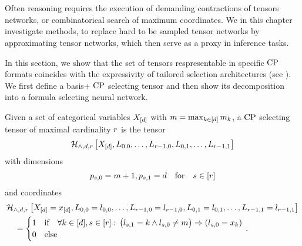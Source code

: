 \chapter{\chatextapproximation}\label{cha:approximation}

Often reasoning requires the execution of demanding contractions of tensors networks, or combinatorical search of maximum coordinates.
We in this chapter investigate methods, to replace hard to be sampled tensor networks by approximating tensor networks, which then serve as a proxy in inference tasks.



In this section, we show that the set of tensors respresentable in specific $\mathrm{CP}$ formats coincides with the expressivity of tailored selection architectures (see ).
We first define a basis+ $\mathrm{CP}$ selecting tensor and then show its decomposition into a formula selecting neural network.

\begin{definition}
    \label{def:cpSelection}
    Given a set of categorical variables $X_{[d]}$ with $m=\max_{k\in[d]}m_{k}$, a $\mathrm{CP}$ selecting tensor of maximal cardinality $r$ is the tensor
    \begin{align*}
        \mathcal{H}_{\land,d,r}\left[X_{[d]},L_{0,0},\ldots,L_{r-1,0},L_{0,1},\ldots,L_{r-1,1}\right]
    \end{align*}
    with dimensions
    \begin{align*}
        p_{s,0} = m+1, p_{s,1} = d \quad \text{for} \quad s\in[r]
    \end{align*}
    and coordinates
    \begin{align*}
        & \mathcal{H}_{\land,d,r}\left[X_{[d]}=x_{[d]},L_{0,0}=l_{0,0},\ldots,L_{r-1,0}=l_{r-1,0},L_{0,1}=l_{0,1},\ldots,L_{r-1,1}=l_{r-1,1}\right] \\
        & \quad = \begin{cases}
                      1 & \text{if} \quad
                      \forall{k\in[d],s\in[r]} : \, \big(l_{s,1} = k \land l_{s,0} \neq m \big) \Rightarrow  (l_{s,0} = x_{k})  \\
                      0 & \text{else}
        \end{cases} \, .
    \end{align*}
\end{definition}

